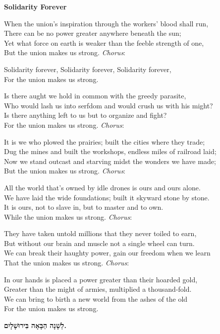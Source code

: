 \begin{english}
\begin{center}
{\bfseries \large Solidarity Forever}
\end{center}

When the union's inspiration through the workers' blood shall run, \\
There can be no power greater anywhere beneath the sun; \\
Yet what force on earth is weaker than the feeble strength of one, \\
But the union makes us strong. {\itshape Chorus}:

\begin{center}
Solidarity forever,
Solidarity forever,
Solidarity forever, \\
For the union makes us strong.
\end{center}

Is there aught we hold in common with the greedy parasite, \\
Who would lash us into serfdom and would crush us with his might? \\
Is there anything left to us but to organize and fight? \\
For the union makes us strong. {\itshape Chorus}: \vspace{1em}

It is we who plowed the prairies; built the cities where they trade; \\
Dug the mines and built the workshops, endless miles of railroad laid; \\
Now we stand outcast and starving midst the wonders we have made; \\
But the union makes us strong. {\itshape Chorus}: \vspace{1em}

All the world that's owned by idle drones is ours and ours alone. \\
We have laid the wide foundations; built it skyward stone by stone. \\
It is ours, not to slave in, but to master and to own. \\
While the union makes us strong. {\itshape Chorus}: \vspace{1em}

They have taken untold millions that they never toiled to earn, \\
But without our brain and muscle not a single wheel can turn. \\
We can break their haughty power, gain our freedom when we learn \\
That the union makes us strong. {\itshape Chorus}: \vspace{1em}

In our hands is placed a power greater than their hoarded gold, \\
Greater than the might of armies, multiplied a thousand-fold. \\
We can bring to birth a new world from the ashes of the old \\
For the union makes us strong.
\end{english}

\vspace{2em}

{\Huge \bfseries
 לְשָׁנָה הַבָּאָה בִּירוּשָׁלָיִם.
}